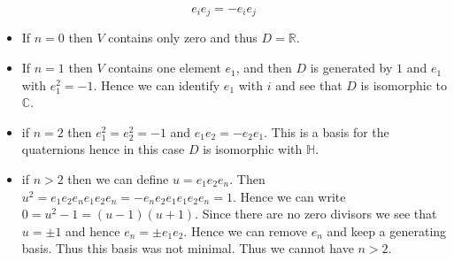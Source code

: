 \documentclass[../Thesis.tex]{subfiles}
\begin{document}
\begin{myproof}
\begin{equation}
e_ie_j = - e_ie_j
\end{equation}
\begin{itemize}
\item If $n = 0 $ then $V$ contains only zero and thus $D = \mathbb{R}$.
\item If $n = 1 $ then $V$ contains one element $e_1$, and then $D$ is generated by $1$ and $e_1$ with $e_1^2 = -1$. Hence we can identify $e_1$ with $i$ and see that $D$ is isomorphic to $\mathbb{C}$.
\item if $n = 2$ then $e_1^2 = e_2^2 = -1$ and $e_1e_2 = -e_2e_1$. This is a basis for the quaternions hence in this case $D$ is isomorphic with $\mathbb{H}$.
\item if $n > 2$ then we can define $u = e_1e_2e_n$. Then $u^2 = e_1e_2e_n e_1 e_2e_n = -e_ne_2e_1e_1e_2e_n = 1$. Hence we can write $0 = u^2 -1 = (u-1)(u+1)$. Since there are no zero divisors we see that $u = \pm 1$ and hence $e_n = \pm e_1e_2$. Hence we can remove $e_n$ and keep a generating basis. Thus this basis was not minimal. Thus we cannot have $n >2$.
\end{itemize}
\end{myproof}
\end{document}
